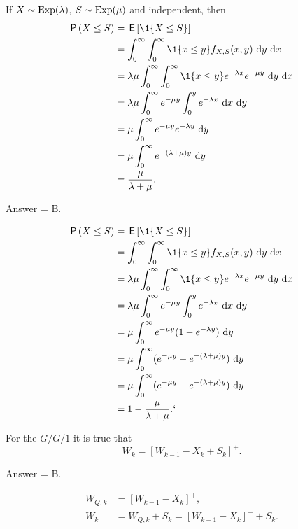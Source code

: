 \begin{exercise}[201704] %
 If $X\sim \operatorname{Exp}(\lambda)$, $S\sim\operatorname{Exp}(\mu)$ and independent, 
then
\begin{equation*}
 \begin{split}
 \P{X\leq S} 
&= \E{\1{X\leq S}} \\
&= \int_0^\infty \int_0^\infty \1{x\leq y} f_{X,S}(x,y)\, \d y\,\d x\\
&= \lambda \mu \int_0^\infty \int_0^\infty \1{x\leq y} e^{-\lambda x} e^{-\mu y} \, \d y\,\d x\\
&= \lambda \mu \int_0^\infty e^{-\mu y} \int_0^y e^{-\lambda x}\, \d x \, \d y \\
&= \mu \int_0^\infty e^{-\mu y} e^{-\lambda y}\,\d y\\
&= \mu \int_0^\infty e^{-(\lambda +\mu)y} \,\d y\\
&= \frac{\mu}{\lambda + \mu}.
 \end{split}
\end{equation*}

\begin{solution}
Answer = B.

\begin{equation*}
 \begin{split}
 \P{X\leq S} 
&= \E{\1{X\leq S}} \\
&= \int_0^\infty \int_0^\infty \1{x\leq y} f_{X,S}(x,y)\, \d y\,\d x\\
&= \lambda \mu \int_0^\infty \int_0^\infty \1{x\leq y} e^{-\lambda x} e^{-\mu y} \, \d y\,\d x\\
&= \lambda \mu \int_0^\infty e^{-\mu y} \int_0^y e^{-\lambda x}\, \d x \, \d y \\
&= \mu \int_0^\infty e^{-\mu y} (1-e^{-\lambda y})\,\d y\\
&= \mu \int_0^\infty (e^{-\mu y} - e^{-(\lambda +\mu)y} ) \,\d y\\
&= \mu \int_0^\infty (e^{-\mu y} - e^{-(\lambda +\mu)y} ) \,\d y\\
&= 1 - \frac{\mu}{\lambda + \mu}.`
 \end{split}
\end{equation*}

\end{solution}
\end{exercise}

\begin{exercise}[201704] %
For the $G/G/1$ it is true that
\begin{equation*}
 W_{k} = [W_{k-1} - X_k + S_k]^+.
\end{equation*}

\begin{solution}
 Answer = B.

\begin{equation}
 \begin{split}
 W_{Q,k} &= [W_{k-1} - X_k]^+,\\
 W_{k} &= W_{Q,k} + S_k = [W_{k-1} - X_k]^+ + S_k.
 \end{split}
\end{equation}
\end{solution}
\end{exercise}

